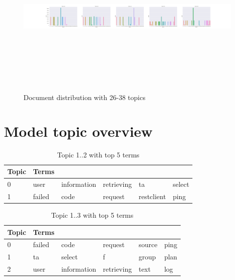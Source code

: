 \begin{figure}[h]
    \centering
    \includegraphics[width=15cm, height=8cm]{figures/doc_distr/doc_distribution_26-38_corpus.png}
    \caption{Document distribution with 26-38 topics}
    \label{fig:Doc_distr_26-38heldout}
\end{figure}

\FloatBarrier
\section{Model topic overview}\label{appendices:modelgeneratedtopics}

\begin{table}[h]
\centering
\begin{tabular}{|l|l|l|l|l|l|}
 \hline
 Topic & Terms & & & & \\
 \hline
 \hline
 0 & user & information & retrieving & ta & select\\ 
 \hline 
 1 & failed & code & request & restclient & ping\\ 
 \hline 
\end{tabular}
\caption{Topic 1..2 with top 5 terms}
\label{tab:appendix2topicsmodel}
\end{table}

\begin{table}[!htb]
\centering
\begin{tabular}{|l|l|l|l|l|l|}
 \hline
 Topic & Terms & & & & \\
 \hline
 0 & failed & code & request & source & ping\\ 
 \hline 
 1 & ta & select & f & group & plan\\ 
 \hline 
 2 & user & information & retrieving & text & log\\ 
 \hline 
\end{tabular}
\caption{Topic 1..3 with top 5 terms}
\label{tab:3topicsmodel}
\end{table}
 

